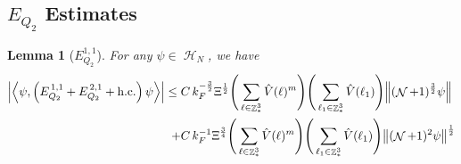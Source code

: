 \documentclass[sn-mathphys, Numbered ,a4paper]{sn-jnl}%
\DeclareMathOperator{\Z}{\mathbb{Z}}
\DeclareMathOperator{\HH}{\mathcal{H}}
\DeclareMathOperator{\NN}{\mathcal{N}}
\newcommand{\half}{\frac{1}{2}}
\newcommand{\eva}[1]{\left\langle #1 \right\rangle}
\theoremstyle{plain}
\newtheorem{lemma}[theorem]{Lemma}
\theoremstyle{definition}
\theoremstyle{remark}
\theoremstyle{plain}
\theoremstyle{definition}
\theoremstyle{remark}
\begin{document}
\subsection{$E_{Q_2}$ Estimates}
\begin{lemma}[$E_{Q_2}^{1,1}$]\label{lem:EQ211}
    For any $\psi \in \HH_N$, we have
    \begin{align}
    	\abs{\eva{\psi,\left(E^{\,1,1}_{Q_2}+E^{\,2,1}_{Q_2}+\mathrm{h.c.}\right) \psi }}
    	 \leq \; &C\,  k_{F}^{-\frac{3}{2}} \Xi^\half \Bigg(\sum\limits_{\ell \in \Z^3_*} \hat{V}(\ell)^m\Bigg)\Bigg( \sum\limits_{\ell_1 \in \Z^3_*} \hat{V}(\ell_1) \Bigg) \norm { (\NN+1)^{\frac{3}{2}} \psi }\\
    	 \;+ &C\, k_{F}^{-1}\Xi^{\frac{3}{4}} \Bigg(\sum\limits_{\ell \in \Z^3_*} \hat{V}(\ell)^m\Bigg) \Bigg(\sum\limits_{\ell_1 \in \Z^3_*} \hat{V}(\ell_1) \Bigg)  \norm{ (\NN+1)^2\psi}^\half\label{eq:estEQ211}
    \end{align}
\end{lemma}
\end{document}

